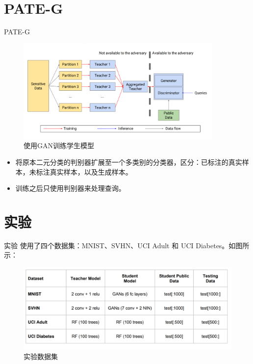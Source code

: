\documentclass[aspectratio=169]{beamer}
\begin{document}
\section{PATE-G}
\begin{frame}{PATE-G}
\begin{figure}[!h]
\includegraphics[width = 4in]{fig/student-model-gan.png}
\caption{使用GAN训练学生模型}
\end{figure}
\begin{itemize}
\item 将原本二元分类的判别器扩展至一个多类别的分类器，区分：已标注的真实样本，未标注真实样本，以及生成样本。
\item 训练之后只使用判别器来处理查询。
\end{itemize}
\end{frame}

\section{实验}
\begin{frame}{实验}
使用了四个数据集：MNIST、SVHN、UCI Adult 和 UCI Diabetes。如图所示：
\begin{figure}
\includegraphics[width = \linewidth]{fig/experiment-settings.png}
\caption{实验数据集}
\end{figure}
\end{frame}
\end{document}
